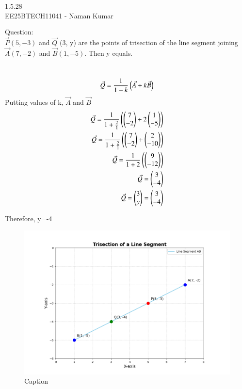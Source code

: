 \documentclass[a4paper, 11pt]{article}
\author{EE25BTECH11041-Naman Kumar }
\begin{document}
\begin{center}
    \huge{1.5.28}\\
    \large{EE25BTECH11041 - Naman Kumar}
\end{center}
Question:\\
$\Vec{P} (5, -3)$ and $\Vec{Q}$ (3, y) are the points of trisection of the line segment joining $\Vec{A} (7, -2)$ and $\Vec{B} (1, -5)$. Then y equals.

\solution \\
\begin{align}
\Vec{Q}=\frac{1}{1+k}\left(\Vec{A}+k\Vec{B}\right)\\
\end{align}
Putting values of k, $\Vec{A}$ and $\Vec{B}$\\
\begin{align}
\Vec{Q}=\frac{1}{1+\frac{2}{1}}\left(\begin{pmatrix}7\\-2\end{pmatrix}+2\begin{pmatrix}1\\-5\end{pmatrix}\right)\\
\Vec{Q}=\frac{1}{1+\frac{2}{1}}\left(\begin{pmatrix}7\\-2\end{pmatrix}+\begin{pmatrix}2\\-10\end{pmatrix}\right)\\
\Vec{Q}=\frac{1}{1+2}\left(\begin{pmatrix}9\\-12\end{pmatrix}\right)\\
\Vec{Q}=\begin{pmatrix}3\\-4\end{pmatrix}\\
\Vec{Q}=\begin{pmatrix}3\\y\end{pmatrix}=\begin{pmatrix}3\\-4\end{pmatrix}
\end{align}
\begin{center}
Therefore, y=-4
\end{center}
\newpage
\begin{figure}
    \centering
    \includegraphics[width=\columnwidth]{figs/trisection_plot.png}
    \caption{Caption}
    \label{fig:placeholder}
\end{figure}
\end{document}
